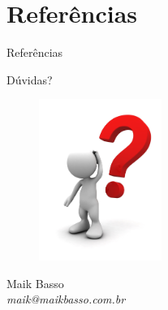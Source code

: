 \documentclass[handout]{beamer}
\begin{document}
\section{Referências}

\begin{frame}[allowframebreaks]{Referências}
	\tiny
	
	\nocite{*}
	
\end{frame}

\begin{frame}{Dúvidas?}
	\begin{figure}[h]
		\includegraphics[width=4cm]{perguntas}
	\end{figure}
	\begin{center}
		\normalsize
		Maik Basso \\
		\textit{maik@maikbasso.com.br}
	\end{center}
\end{frame}
\end{document}
